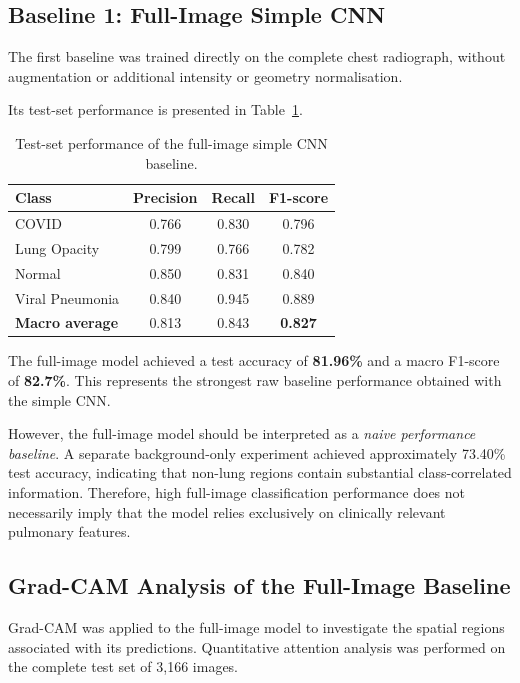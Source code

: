 \subsection{Baseline 1: Full-Image Simple CNN}
\label{subsec:full_baseline}

The first baseline was trained directly on the complete chest radiograph,
without augmentation or additional intensity or geometry normalisation.

Its test-set performance is presented in
Table~\ref{tab:full_baseline_results}.

\begin{table}[H]
\centering
\caption{Test-set performance of the full-image simple CNN baseline.}
\label{tab:full_baseline_results}
\begin{tabular}{lccc}
\toprule
\textbf{Class} & \textbf{Precision} & \textbf{Recall} & \textbf{F1-score} \\
\midrule
COVID            & 0.766 & 0.830 & 0.796 \\
Lung Opacity     & 0.799 & 0.766 & 0.782 \\
Normal           & 0.850 & 0.831 & 0.840 \\
Viral Pneumonia  & 0.840 & 0.945 & 0.889 \\
\midrule
\textbf{Macro average} & 0.813 & 0.843 & \textbf{0.827} \\
\bottomrule
\end{tabular}
\end{table}

The full-image model achieved a test accuracy of \textbf{81.96\%} and a macro
F1-score of \textbf{82.7\%}. This represents the strongest raw baseline
performance obtained with the simple CNN.

However, the full-image model should be interpreted as a \emph{naive
performance baseline}. A separate background-only experiment achieved
approximately 73.40\% test accuracy, indicating that non-lung regions contain
substantial class-correlated information. Therefore, high full-image
classification performance does not necessarily imply that the model relies
exclusively on clinically relevant pulmonary features.

\subsection{Grad-CAM Analysis of the Full-Image Baseline}
\label{subsec:full_gradcam}

Grad-CAM was applied to the full-image model to investigate the spatial regions
associated with its predictions. Quantitative attention analysis was performed
on the complete test set of 3,166 images.


